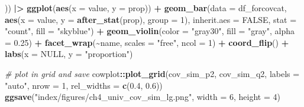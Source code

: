 \documentclass[12pt, twoside]{amherstthesis}
\newenvironment{Shaded}{\begin{snugshade}}{\end{snugshade}}
\newcommand{\AttributeTok}[1]{\textcolor[rgb]{0.13,0.29,0.53}{#1}}
\newcommand{\CommentTok}[1]{\textcolor[rgb]{0.56,0.35,0.01}{\textit{#1}}}
\newcommand{\ConstantTok}[1]{\textcolor[rgb]{0.56,0.35,0.01}{#1}}
\newcommand{\DecValTok}[1]{\textcolor[rgb]{0.00,0.00,0.81}{#1}}
\newcommand{\FloatTok}[1]{\textcolor[rgb]{0.00,0.00,0.81}{#1}}
\newcommand{\FunctionTok}[1]{\textcolor[rgb]{0.13,0.29,0.53}{\textbf{#1}}}
\newcommand{\NormalTok}[1]{#1}
\newcommand{\SpecialCharTok}[1]{\textcolor[rgb]{0.81,0.36,0.00}{\textbf{#1}}}
\newcommand{\StringTok}[1]{\textcolor[rgb]{0.31,0.60,0.02}{#1}}
\begin{document}
\begin{Shaded}
\begin{Highlighting}[]
\NormalTok{  )) }\SpecialCharTok{|\textgreater{}} 
  \FunctionTok{ggplot}\NormalTok{(}\FunctionTok{aes}\NormalTok{(}\AttributeTok{x =}\NormalTok{ value, }\AttributeTok{y =}\NormalTok{ prop)) }\SpecialCharTok{+}
  \FunctionTok{geom\_bar}\NormalTok{(}\AttributeTok{data =}\NormalTok{ df\_forcovcat, }\FunctionTok{aes}\NormalTok{(}\AttributeTok{x =}\NormalTok{ value, }\AttributeTok{y =} \FunctionTok{after\_stat}\NormalTok{(prop), }\AttributeTok{group =} \DecValTok{1}\NormalTok{), }
           \AttributeTok{inherit.aes =} \ConstantTok{FALSE}\NormalTok{, }\AttributeTok{stat =} \StringTok{"count"}\NormalTok{, }\AttributeTok{fill =} \StringTok{"skyblue"}\NormalTok{) }\SpecialCharTok{+}
  \FunctionTok{geom\_violin}\NormalTok{(}\AttributeTok{color =} \StringTok{"gray30"}\NormalTok{, }\AttributeTok{fill =} \StringTok{"gray"}\NormalTok{, }\AttributeTok{alpha =} \FloatTok{0.25}\NormalTok{) }\SpecialCharTok{+} 
  \FunctionTok{facet\_wrap}\NormalTok{(}\SpecialCharTok{\textasciitilde{}}\NormalTok{name, }\AttributeTok{scales =} \StringTok{"free"}\NormalTok{, }\AttributeTok{ncol =} \DecValTok{1}\NormalTok{) }\SpecialCharTok{+}
  \FunctionTok{coord\_flip}\NormalTok{() }\SpecialCharTok{+}
  \FunctionTok{labs}\NormalTok{(}\AttributeTok{x =} \ConstantTok{NULL}\NormalTok{, }\AttributeTok{y =} \StringTok{"proportion"}\NormalTok{)}

\CommentTok{\# plot in grid and save}
\NormalTok{cowplot}\SpecialCharTok{::}\FunctionTok{plot\_grid}\NormalTok{(cov\_sim\_p2, cov\_sim\_q2, }\AttributeTok{labels =} \StringTok{"auto"}\NormalTok{, }\AttributeTok{nrow =} \DecValTok{1}\NormalTok{, }
                   \AttributeTok{rel\_widths =} \FunctionTok{c}\NormalTok{(}\FloatTok{0.4}\NormalTok{, }\FloatTok{0.6}\NormalTok{))}
\FunctionTok{ggsave}\NormalTok{(}\StringTok{"index/figures/ch4\_univ\_cov\_sim\_lg.png"}\NormalTok{, }\AttributeTok{width =} \DecValTok{6}\NormalTok{, }\AttributeTok{height =} \DecValTok{4}\NormalTok{)}
\end{Highlighting}
\end{Shaded}
\normalsize
\end{document}
